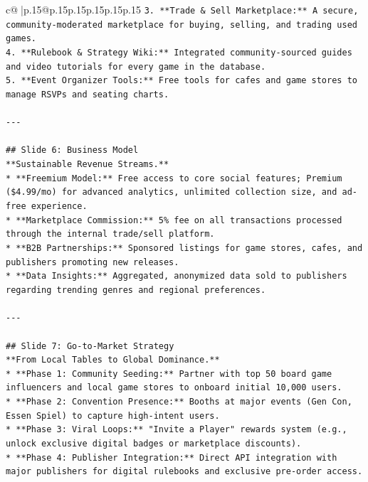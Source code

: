 \documentclass{article}
\begin{document}
{\begin{supertabular}{c@{$\;$}|p{.15\linewidth}@{}p{.15\linewidth}p{.15\linewidth}p{.15\linewidth}p{.15\linewidth}p{.15\linewidth}}
{{{\texttt{3.  **Trade \& Sell Marketplace:** A secure, community{-}moderated marketplace for buying, selling, and trading used games.} \\
\texttt{4.  **Rulebook \& Strategy Wiki:** Integrated community{-}sourced guides and video tutorials for every game in the database.} \\
\texttt{5.  **Event Organizer Tools:** Free tools for cafes and game stores to manage RSVPs and seating charts.} \\
\\ 
\texttt{{-}{-}{-}} \\
\\ 
\texttt{\#\# Slide 6: Business Model} \\
\texttt{**Sustainable Revenue Streams.**} \\
\texttt{*   **Freemium Model:** Free access to core social features; Premium (\$4.99/mo) for advanced analytics, unlimited collection size, and ad{-}free experience.} \\
\texttt{*   **Marketplace Commission:** 5\% fee on all transactions processed through the internal trade/sell platform.} \\
\texttt{*   **B2B Partnerships:** Sponsored listings for game stores, cafes, and publishers promoting new releases.} \\
\texttt{*   **Data Insights:** Aggregated, anonymized data sold to publishers regarding trending genres and regional preferences.} \\
\\ 
\texttt{{-}{-}{-}} \\
\\ 
\texttt{\#\# Slide 7: Go{-}to{-}Market Strategy} \\
\texttt{**From Local Tables to Global Dominance.**} \\
\texttt{*   **Phase 1: Community Seeding:** Partner with top 50 board game influencers and local game stores to onboard initial 10,000 users.} \\
\texttt{*   **Phase 2: Convention Presence:** Booths at major events (Gen Con, Essen Spiel) to capture high{-}intent users.} \\
\texttt{*   **Phase 3: Viral Loops:** "Invite a Player" rewards system (e.g., unlock exclusive digital badges or marketplace discounts).} \\
\texttt{*   **Phase 4: Publisher Integration:** Direct API integration with major publishers for digital rulebooks and exclusive pre{-}order access.} \\
\\ 
}}}
\end{supertabular}}
\end{document}
